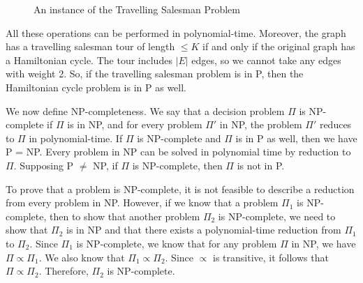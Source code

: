 \documentclass[a4paper, openany]{memoir}
\begin{document}
\begin{figure}[H]
    \centering
    \caption{An instance of the Travelling Salesman Problem}
\end{figure}
\noindent All these operations can be performed in polynomial-time. Moreover, the graph has a travelling salesman tour of length $\leq K$ if and only if the original graph has a Hamiltonian cycle. The tour includes $|E|$ edges, so we cannot take any edges with weight 2. So, if the travelling salesman problem is in P, then the Hamiltonian cycle problem is in P as well.

We now define NP-completeness. We say that a decision problem $\Pi$ is NP-complete if $\Pi$ is in NP, and for every problem $\Pi'$ in NP, the problem $\Pi'$ reduces to $\Pi$ in polynomial-time. If $\Pi$ is NP-complete and $\Pi$ is in P as well, then we have P = NP. Every problem in NP can be solved in polynomial time by reduction to $\Pi$. Supposing P $\neq$ NP, if $\Pi$ is NP-complete, then $\Pi$ is not in P.

To prove that a problem is NP-complete, it is not feasible to describe a reduction from every problem in NP. However, if we know that a problem $\Pi_1$ is NP-complete, then to show that another problem $\Pi_2$ is NP-complete, we need to show that $\Pi_2$ is in NP and that there exists a polynomial-time reduction from $\Pi_1$ to $\Pi_2$. Since $\Pi_1$ is NP-complete, we know that for any problem $\Pi$ in NP, we have $\Pi \varpropto \Pi_1$. We also know that $\Pi_1 \varpropto \Pi_2$. Since $\varpropto$ is transitive, it follows that $\Pi \varpropto \Pi_2$. Therefore, $\Pi_2$ is NP-complete.
\end{document}
